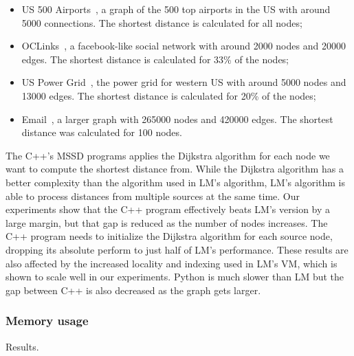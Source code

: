 \begin{itemize}
   \item US 500 Airports~\cite{usairports,tnet}, a graph of the 500 top airports in the US with around
      5000 connections. The shortest distance is calculated for all nodes;
      
   \item OCLinks~\cite{tnet,oclinks}, a facebook-like social network with around 2000 nodes and 20000 edges. The shortest
      distance is calculated for 33\% of the nodes;

   \item US Power Grid~\cite{tnet,uspowergrid}, the power grid for western US with around 5000
      nodes and 13000 edges. The shortest distance is calculated for 20\% of the
      nodes;

   \item Email~\cite{snapnets}, a larger graph with 265000 nodes and 420000
      edges. The shortest distance was calculated for 100 nodes.

\end{itemize}

The C++'s MSSD programs applies the Dijkstra algorithm for each node we want to
compute the shortest distance from. While the Dijkstra algorithm has a better
complexity than the algorithm used in LM's algorithm, LM's algorithm is able to
process distances from multiple sources at the same time. Our experiments show
that the C++ program effectively beats LM's version by a large margin, but that
gap is reduced as the number of nodes increases. The C++ program needs to
initialize the Dijkstra algorithm for each source node, dropping its absolute
perform to just half of LM's performance. These results are also affected by the
increased locality and indexing used in LM's VM, which is shown to scale well in
our experiments. Python is much slower than LM but the gap between C++ is also
decreased as the graph gets larger.

\subsubsection{Memory usage}

\begin{table}[ht]
   \begin{center}
      
   \end{center}
   \caption{Results.}
   \label{table:implementation:mem}
\end{table}

